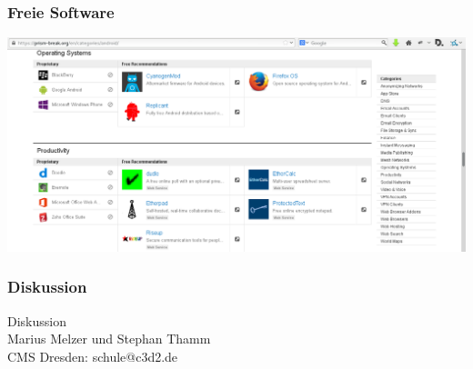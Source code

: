 \documentclass[12pt]{beamer}
\begin{document}
\begin{frame}
    \frametitle{Freie Software}
    \includegraphics[height=0.7\textheight]{img/prism-break2.png}
\end{frame}

\begin{frame}
    \frametitle{Diskussion}
    \begin{center} {\Large Diskussion}\\Marius Melzer und Stephan Thamm\\CMS Dresden: schule@c3d2.de \end{center}
\end{frame}
\end{document}
